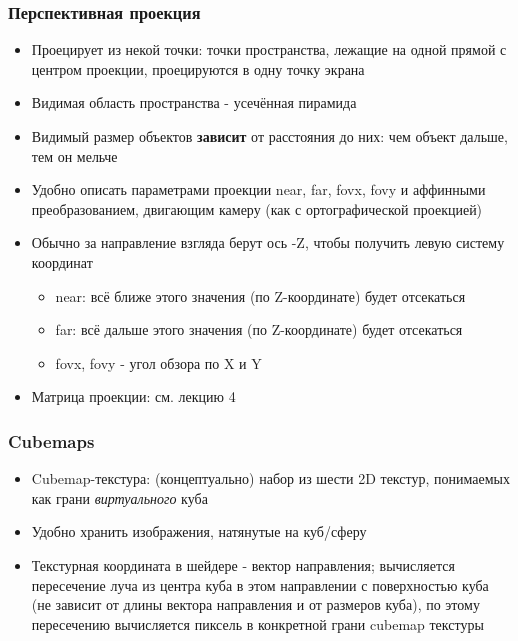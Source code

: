 \documentclass{beamer}
\begin{document}
\begin{frame}[fragile]
\frametitle{Перспективная проекция}
\begin{itemize}
\item Проецирует из некой точки: точки пространства, лежащие на одной прямой с центром проекции, проецируются в одну точку экрана
\pause
\item Видимая область пространства - усечённая пирамида
\pause
\item Видимый размер объектов \textbf{зависит} от расстояния до них: чем объект дальше, тем он мельче
\pause
\item Удобно описать параметрами проекции near, far, fovx, fovy и аффинными преобразованием, двигающим камеру (как с ортографической проекцией)
\pause
\item Обычно за направление взгляда берут ось -Z, чтобы получить левую систему координат
\pause
\begin{itemize}
\item near: всё ближе этого значения (по Z-координате) будет отсекаться
\pause
\item far: всё дальше этого значения (по Z-координате) будет отсекаться
\pause
\item fovx, fovy - угол обзора по X и Y
\end{itemize}
\pause
\item Матрица проекции: см. лекцию 4
\end{itemize}
\end{frame}

\begin{frame}[fragile]
\frametitle{Cubemaps}
\begin{itemize}
\item Cubemap-текстура: (концептуально) набор из шести 2D текстур, понимаемых как грани \textit{виртуального} куба
\pause
\item Удобно хранить изображения, натянутые на куб/сферу
\pause
\item Текстурная координата в шейдере - вектор направления; вычисляется пересечение луча из центра куба в этом направлении с поверхностью куба (не зависит от длины вектора направления и от размеров куба), по этому пересечению вычисляется пиксель в конкретной грани cubemap текстуры
\end{itemize}
\end{frame}
\end{document}
